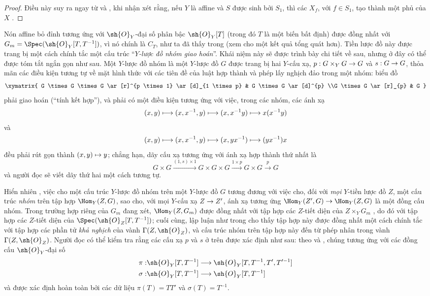 \documentclass[oneside,10pt]{amsart}
\makeatletter
\newcommand{\ega@arrow}[2]{\mathchoice{#1}{#2}{#2}{#2}}
\let\ega@shortmapsto\mapsto
\renewcommand{\to}{\ega@arrow{\longrightarrow}{\rightarrow}}
\renewcommand{\mapsto}{\ega@arrow{\longmapsto}{\ega@shortmapsto}}
\newcommand{\oldpage}[2][]{\marginnote{\normalfont\footnotesize\textbf{#1}~|~#2}\ignorespaces}
\let\EGAOriginalLabel\label
\renewcommand{\label}[1]{\phantomsection\EGAOriginalLabel{#1}}
\makeatother
\begin{document}
\begin{proof}
Điều này suy ra ngay từ  và , khi nhận xét rằng, nếu $Y$ là affine và $S$ được sinh bởi $S_1$, thì các $X_f$, với $f\in S_1$, tạo thành một phủ của $X$ .
\end{proof}
\begin{remark}[8.3.9]
\label{II.8.3.9}
Nón affine bỏ đỉnh tương ứng với $\sh{O}_Y$-đại số phân bậc $\sh{O}_Y[T]$ (trong đó $T$ là một biến bất định) được đồng nhất với $G_m=\Spec(\sh{O}_Y[T,T^{-1}])$, vì nó chính là $C_T$, như ta đã thấy trong  (xem  cho một kết quả tổng quát hơn).
Tiền lược đồ này được trang bị một cách chính tắc một cấu trúc \textquotedblleft\emph{$Y$-lược đồ nhóm giao hoán}\textquotedblright.
Khái niệm này sẽ được trình bày chi tiết về sau, nhưng ở đây có thể được tóm tắt ngắn gọn như sau.
Một $Y$-lược đồ nhóm là một $Y$-lược đồ $G$ được trang bị hai $Y$-cấu xạ, $p:G\times_Y G\to G$ và $s:G\to G$, thỏa mãn các điều kiện tương tự về mặt hình thức với các tiên đề của luật hợp thành và phép lấy nghịch đảo trong một nhóm: biểu đồ
\[
  \xymatrix{
    G \times G \times G
      \ar[r]^{p \times 1}
      \ar[d]_{1 \times p}
  & G \times G
      \ar[d]^{p}
  \\G \times G
      \ar[r]_{p}
  & G
  }
\]
phải giao hoán (\textquotedblleft tính kết hợp\textquotedblright), và phải có một điều kiện tương ứng với việc, trong các nhóm, các ánh xạ
\[
  (x,y)
  \mapsto
  (x,x^{-1},y)
  \mapsto
  (x,x^{-1}y)
  \mapsto
  x(x^{-1}y)
\]
và
\[
  (x,y)
  \mapsto
  (x,x^{-1},y)
  \mapsto
  (x,yx^{-1})
  \mapsto
  (yx^{-1})x
\]
đều phải rút gọn thành $(x,y)\mapsto y$;
chẳng hạn, dãy cấu xạ tương ứng với ánh xạ hợp thành thứ nhất là
\[
  G \times G
  \xrightarrow{(1,s) \times 1}
  G \times G \times G
  \xrightarrow{1 \times p}
  G\times G
  \xrightarrow{p}
  G
\]
và người đọc sẽ viết dãy thứ hai một cách tương tự.

\oldpage[II]{167}
Hiển nhiên , việc cho một cấu trúc $Y$-lược đồ nhóm trên một $Y$-lược đồ $G$ tương đương với việc cho, đối với \emph{mọi} $Y$-tiền lược đồ $Z$, một cấu trúc \emph{nhóm} trên tập hợp $\Hom_Y(Z,G)$, sao cho, với mọi $Y$-cấu xạ $Z\to Z'$, ánh xạ tương ứng $\Hom_Y(Z',G)\to\Hom_Y(Z,G)$ là một đồng cấu nhóm.
Trong trường hợp riêng của $G_m$ đang xét, $\Hom_Y(Z,G_m)$ được đồng nhất với tập hợp các $Z$-tiết diện của $Z\times_Y G_m$ , do đó với tập hợp các $Z$-tiết diện của $\Spec(\sh{O}_Z[T,T^{-1}])$;
cuối cùng, lập luận như trong  cho thấy tập hợp này được đồng nhất một cách chính tắc với tập hợp các phần tử \emph{khả nghịch} của vành $\Gamma(Z,\sh{O}_Z)$, và cấu trúc nhóm trên tập hợp này đến từ phép nhân trong vành $\Gamma(Z,\sh{O}_Z)$.
Người đọc có thể kiểm tra rằng các cấu xạ $p$ và $s$ ở trên được xác định như sau: theo  và , chúng tương ứng với các đồng cấu $\sh{O}_Y$-đại số
\begin{align*}
  \pi: &\sh{O}_Y[T,T^{-1}] \to \sh{O}_Y[T,T^{-1},T',T'^{-1}]
\\\sigma: &\sh{O}_Y[T,T^{-1}] \to \sh{O}_Y[T,T^{-1}]
\end{align*}
và được xác định hoàn toàn bởi các dữ liệu $\pi(T)=TT'$ và $\sigma(T)=T^{-1}$.


\end{remark}
\end{document}
